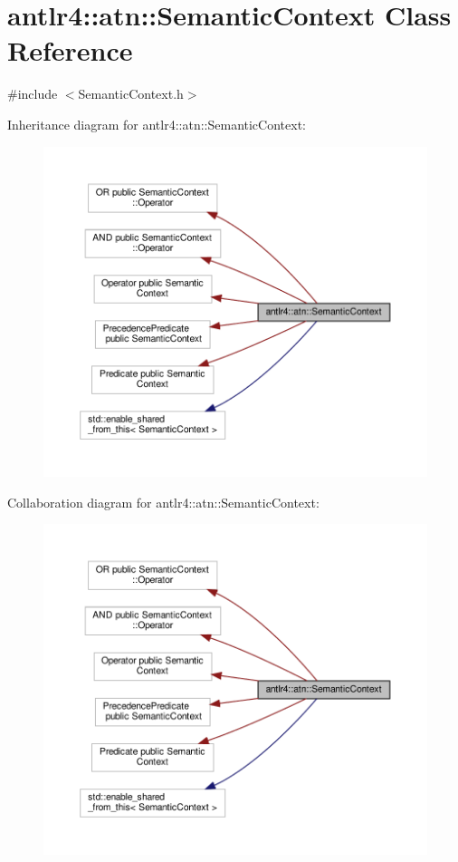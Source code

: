 \hypertarget{classantlr4_1_1atn_1_1SemanticContext}{}\section{antlr4\+:\+:atn\+:\+:Semantic\+Context Class Reference}
\label{classantlr4_1_1atn_1_1SemanticContext}


{\ttfamily \#include $<$Semantic\+Context.\+h$>$}



Inheritance diagram for antlr4\+:\+:atn\+:\+:Semantic\+Context\+:
\nopagebreak
\begin{figure}[H]
\begin{center}
\leavevmode
\includegraphics[width=350pt]{classantlr4_1_1atn_1_1SemanticContext__inherit__graph}
\end{center}
\end{figure}


Collaboration diagram for antlr4\+:\+:atn\+:\+:Semantic\+Context\+:
\nopagebreak
\begin{figure}[H]
\begin{center}
\leavevmode
\includegraphics[width=350pt]{classantlr4_1_1atn_1_1SemanticContext__coll__graph}
\end{center}
\end{figure}

